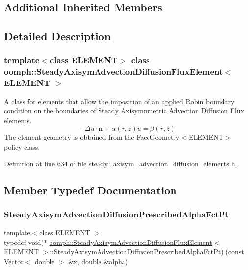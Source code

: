 \subsection*{Additional Inherited Members}


\subsection{Detailed Description}
\subsubsection*{template$<$class E\+L\+E\+M\+E\+NT$>$\newline
class oomph\+::\+Steady\+Axisym\+Advection\+Diffusion\+Flux\+Element$<$ E\+L\+E\+M\+E\+N\+T $>$}

A class for elements that allow the imposition of an applied Robin boundary condition on the boundaries of \hyperlink{classoomph_1_1Steady}{Steady} Axisymmnetric Advection Diffusion Flux elements. \[ -\Delta u \cdot \mathbf{n} + \alpha(r,z) u = \beta(r,z) \] The element geometry is obtained from the Face\+Geometry$<$\+E\+L\+E\+M\+E\+N\+T$>$ policy class. 

Definition at line 634 of file steady\+\_\+axisym\+\_\+advection\+\_\+diffusion\+\_\+elements.\+h.



\subsection{Member Typedef Documentation}
\mbox{\label{classoomph_1_1SteadyAxisymAdvectionDiffusionFluxElement_a28cea997740e6174b3e3583d704229ce}} 
\subsubsection{\texorpdfstring{Steady\+Axisym\+Advection\+Diffusion\+Prescribed\+Alpha\+Fct\+Pt}{SteadyAxisymAdvectionDiffusionPrescribedAlphaFctPt}}
{\footnotesize\ttfamily template$<$class E\+L\+E\+M\+E\+NT $>$ \\
typedef void($\ast$ \hyperlink{classoomph_1_1SteadyAxisymAdvectionDiffusionFluxElement}{oomph\+::\+Steady\+Axisym\+Advection\+Diffusion\+Flux\+Element}$<$ E\+L\+E\+M\+E\+NT $>$\+::Steady\+Axisym\+Advection\+Diffusion\+Prescribed\+Alpha\+Fct\+Pt) (const \hyperlink{classoomph_1_1Vector}{Vector}$<$ double $>$ \&x, double \&alpha)}




